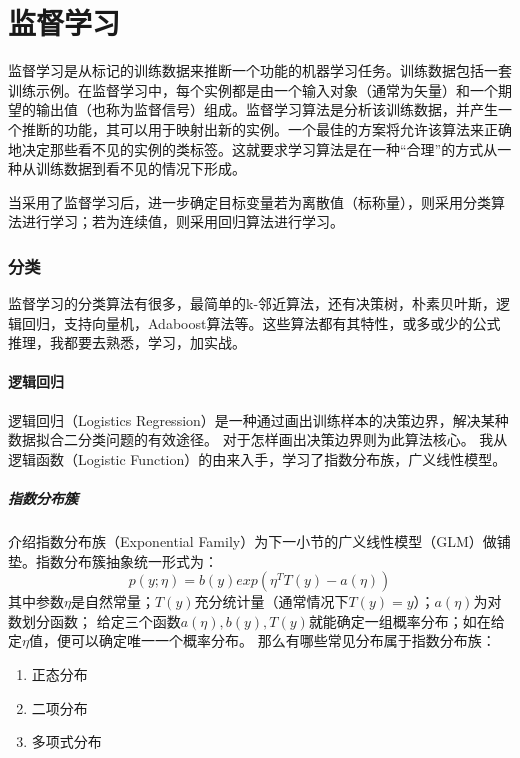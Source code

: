 \part{监督学习}
监督学习是从标记的训练数据来推断一个功能的机器学习任务。训练数据包括一套训练示例。在监督学习中，每个实例都是由一个输入对象（通常为矢量）和一个期望的输出值（也称为监督信号）组成。监督学习算法是分析该训练数据，并产生一个推断的功能，其可以用于映射出新的实例。一个最佳的方案将允许该算法来正确地决定那些看不见的实例的类标签。这就要求学习算法是在一种“合理”的方式从一种从训练数据到看不见的情况下形成。

当采用了监督学习后，进一步确定目标变量若为离散值（标称量），则采用分类算法进行学习；若为连续值，则采用回归算法进行学习。

\section{分类}
监督学习的分类算法有很多，最简单的k-邻近算法，还有决策树，朴素贝叶斯，逻辑回归，支持向量机，Adaboost算法等。这些算法都有其特性，或多或少的公式推理，我都要去熟悉，学习，加实战。

\subsection{逻辑回归}
逻辑回归（Logistics Regression）是一种通过画出训练样本的决策边界，解决某种数据拟合二分类问题的有效途径。
对于怎样画出决策边界则为此算法核心。
我从逻辑函数（Logistic Function）的由来入手，学习了指数分布族，广义线性模型。

\subsubsection{指数分布簇}

介绍指数分布族（Exponential Family）为下一小节的广义线性模型（GLM）做铺垫。指数分布簇抽象统一形式为：
\begin{equation}
  p(y;\eta)=b(y)exp(\eta^T T(y)-a(\eta))
\end{equation}
其中参数$\eta$是自然常量；$T(y)$充分统计量（通常情况下$T(y)=y$）；$a(\eta)$为对数划分函数；
给定三个函数$a(\eta),b(y),T(y)$就能确定一组概率分布；如在给定$\eta$值，便可以确定唯一一个概率分布。
那么有哪些常见分布属于指数分布族：
\begin{enumerate}
  \item 正态分布
  \item 二项分布
  \item 多项式分布
\end{enumerate}

